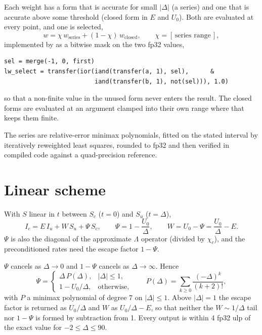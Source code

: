 \documentclass[paper=a4, fontsize=11pt]{scrartcl}
\numberwithin{equation}{section}
\numberwithin{table}{section}
\newcommand{\fort}[1]{\smash{\texttt{#1}}}
\begin{document}
Each weight has a form that is accurate for small $|\Delta|$ (a series) and one
that is accurate above some threshold (closed form in $E$ and $U_0$). Both are
evaluated at every point, and one is selected,
\begin{equation}
  w = \chi\, w_{\mathrm{series}} + (1-\chi)\, w_{\mathrm{closed}},\qquad
  \chi = [\,\text{series range}\,],
\end{equation}
implemented by \fort{lw_select(a, b, first)} as a bitwise mask on the two fp32
values,
\begin{verbatim}
sel = merge(-1, 0, first)
lw_select = transfer(ior(iand(transfer(a, 1), sel),      &
                         iand(transfer(b, 1), not(sel))), 1.0)
\end{verbatim}
so that a non-finite value in the unused form never enters the result. The closed
forms are evaluated at an argument clamped into their own range where that
keeps them finite.

The series are relative-error minimax polynomials, fitted on the stated
interval by iteratively reweighted least squares, rounded to fp32 and then
verified in compiled code against a quad-precision reference.

\section{Linear scheme}

With $S$ linear in $t$ between $S_c$ ($t=0$) and $S_u$ ($t=\Delta$),
\begin{equation}
  I_c = E\, I_u + W\, S_u + \Psi\, S_c ,\qquad
  \Psi = 1-\frac{U_0}{\Delta},\qquad W = U_0 - \Psi = \frac{U_0}{\Delta}-E .
  \label{eq:linear}
\end{equation}
$\Psi$ is also the diagonal of the approximate $\Lambda$ operator (divided by
$\chi_c$), and the preconditioned rates need the escape factor $1-\Psi$.

$\Psi$ cancels as $\Delta\to0$ and $1-\Psi$ cancels as $\Delta\to\infty$. Hence
\begin{equation}
  \Psi = \begin{cases}
    \Delta\, P(\Delta), & |\Delta|\le 1,\\[2pt]
    1-U_0/\Delta, & \text{otherwise},
  \end{cases}
  \qquad
  P(\Delta) = \sum_{k\ge0}\frac{(-\Delta)^k}{(k+2)!},
\end{equation}
with $P$ a minimax polynomial of degree 7 on $|\Delta|\le1$. Above $|\Delta|=1$
the escape factor is returned as $U_0/\Delta$ and $W$ as $U_0/\Delta-E$, so that
neither the $W\sim1/\Delta$ tail nor $1-\Psi$ is formed by subtraction from 1.
Every output is within 4 fp32 ulp of the exact value for
$-2\le\Delta\le90$.
\end{document}
